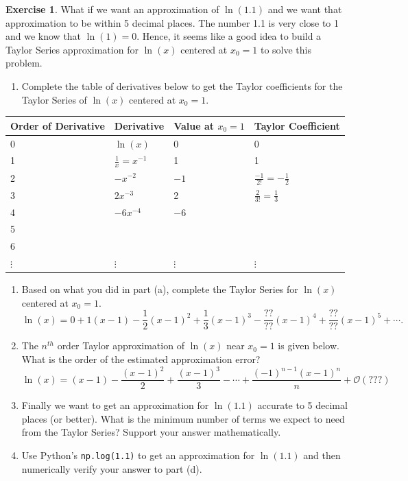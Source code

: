 \documentclass[
]{book}
\providecommand{\tightlist}{%
  \setlength{\itemsep}{0pt}\setlength{\parskip}{0pt}}
\theoremstyle{definition}
\theoremstyle{definition}
\theoremstyle{definition}
\newtheorem{exercise}{Exercise}[chapter]
\theoremstyle{remark}
\begin{document}
\begin{exercise}
\protect\hypertarget{exr:unnamed-chunk-50}{}{\label{exr:unnamed-chunk-50} }What if we want an approximation of \(\ln(1.1)\) and we want that approximation to be within 5 decimal places. The number 1.1 is very close to 1 and we know that \(\ln(1) = 0\). Hence, it seems like a good idea to build a Taylor Series approximation for \(\ln(x)\) centered at \(x_0 = 1\) to solve this problem.

\begin{enumerate}
\def\labelenumi{\alph{enumi}.}
\tightlist
\item
  Complete the table of derivatives below to get the Taylor coefficients for the Taylor Series of \(\ln(x)\) centered at \(x_0 = 1\).
\end{enumerate}

\begin{longtable}[]{@{}llll@{}}
\toprule
Order of Derivative & Derivative & Value at \(x_0 = 1\) & Taylor Coefficient\tabularnewline
\midrule
\endhead
0 & \(\ln(x)\) & 0 & 0\tabularnewline
1 & \(\frac{1}{x} = x^{-1}\) & 1 & 1\tabularnewline
2 & \(-x^{-2}\) & \(-1\) & \(\frac{-1}{2!} = -\frac{1}{2}\)\tabularnewline
3 & \(2x^{-3}\) & 2 & \(\frac{2}{3!} = \frac{1}{3}\)\tabularnewline
4 & \(-6x^{-4}\) & \(-6\) &\tabularnewline
5 & & &\tabularnewline
6 & & &\tabularnewline
\(\vdots\) & \(\vdots\) & \(\vdots\) & \(\vdots\)\tabularnewline
\bottomrule
\end{longtable}

\begin{enumerate}
\def\labelenumi{\alph{enumi}.}
\setcounter{enumi}{1}
\tightlist
\item
  Based on what you did in part (a), complete the Taylor Series for \(\ln(x)\) centered at \(x_0 = 1\).
  \[ \ln(x) = 0 + 1(x-1) - \frac{1}{2}(x-1)^2 + \frac{1}{3}(x-1)^3 - \frac{??}{??}(x-1)^4 + \frac{??}{??}(x-1)^5 + \cdots. \]
\item
  The \(n^{th}\) order Taylor approximation of \(\ln(x)\) near \(x_0 = 1\) is given below. What is the order of the estimated approximation error?
  \[ \ln(x) = (x-1) - \frac{(x-1)^2}{2} + \frac{(x-1)^3}{3} - \cdots + \frac{(-1)^{n-1} (x-1)^n}{n} + \mathcal{O}(???) \]
\item
  Finally we want to get an approximation for \(\ln(1.1)\) accurate to 5 decimal places (or better). What is the minimum number of terms we expect to need from the Taylor Series? Support your answer mathematically.
\item
  Use Python's \texttt{np.log(1.1)} to get an approximation for \(\ln(1.1)\) and then numerically verify your answer to part (d).
\end{enumerate}
\end{exercise}
\end{document}
